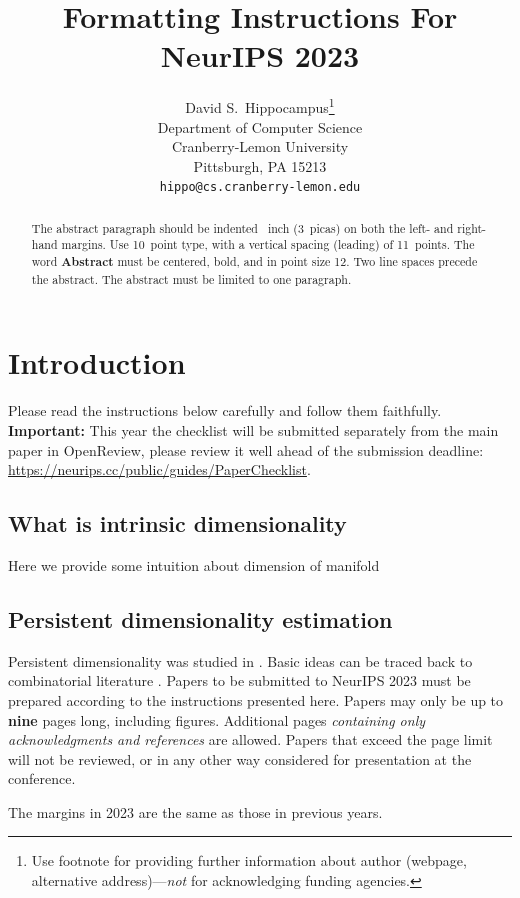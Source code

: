 \documentclass{article}
\title{Formatting Instructions For NeurIPS 2023}
\author{%
  David S.~Hippocampus\thanks{Use footnote for providing further information
    about author (webpage, alternative address)---\emph{not} for acknowledging
    funding agencies.} \\
  Department of Computer Science\\
  Cranberry-Lemon University\\
  Pittsburgh, PA 15213 \\
  \texttt{hippo@cs.cranberry-lemon.edu} \\
}
\begin{document}
\maketitle


\begin{abstract}
  The abstract paragraph should be indented ~inch (3~picas) on
  both the left- and right-hand margins. Use 10~point type, with a vertical
  spacing (leading) of 11~points.  The word \textbf{Abstract} must be centered,
  bold, and in point size 12. Two line spaces precede the abstract. The abstract
  must be limited to one paragraph.
\end{abstract}


\section{Introduction}

Please read the instructions below carefully and follow them faithfully. \textbf{Important:} This year the checklist will be submitted separately from the main paper in OpenReview, please review it well ahead of the submission deadline: \url{https://neurips.cc/public/guides/PaperChecklist}.


\subsection{What is intrinsic dimensionality}

Here we provide some intuition about dimension of manifold

\subsection{Persistent dimensionality estimation}

Persistent dimensionality was studied in \cite{adams2020fractal, birdal2021intrinsic, jaquette2020fractal, schweinhart2021persistent}. Basic ideas can be traced back to combinatorial literature \cite{steele1988growth}. 
Papers to be submitted to NeurIPS 2023 must be prepared according to the
instructions presented here. Papers may only be up to {\bf nine} pages long,
including figures. Additional pages \emph{containing only acknowledgments and
references} are allowed. Papers that exceed the page limit will not be
reviewed, or in any other way considered for presentation at the conference.


The margins in 2023 are the same as those in previous years.
\end{document}

